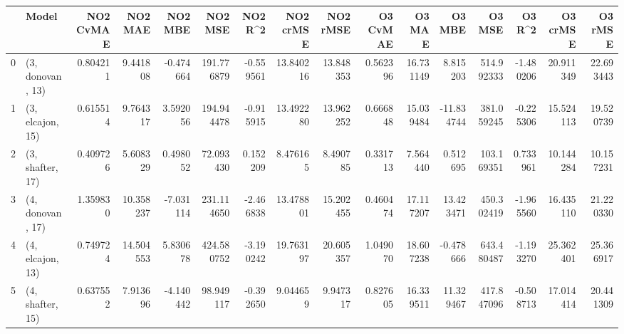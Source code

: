 \begin{tabular}{llrrrrrrrrrrrrrr}
\toprule
{} &             Model &  NO2 CvMAE &    NO2 MAE &   NO2 MBE &     NO2 MSE &   NO2 R\textasciicircum2 &  NO2 crMSE &   NO2 rMSE &  O3 CvMAE &     O3 MAE &     O3 MBE &      O3 MSE &    O3 R\textasciicircum2 &   O3 crMSE &    O3 rMSE \\
\midrule
0 &  (3, donovan, 13) &   0.804211 &   9.441808 & -0.474664 &  191.776879 & -0.559561 &  13.840216 &  13.848353 &  0.562396 &  16.731149 &   8.815203 &  514.992333 & -1.480206 &  20.911349 &  22.693443 \\
1 &  (3, elcajon, 15) &   0.615514 &   9.764317 &  3.592056 &  194.944478 & -0.915915 &  13.492280 &  13.962252 &  0.666848 &  15.039484 & -11.834744 &  381.059245 & -0.225306 &  15.524113 &  19.520739 \\
2 &  (3, shafter, 17) &   0.409726 &   5.608329 &  0.498052 &   72.093430 &  0.152209 &   8.476165 &   8.490785 &  0.331713 &   7.564440 &   0.512695 &  103.169351 &  0.733961 &  10.144284 &  10.157231 \\
3 &  (4, donovan, 17) &   1.359830 &  10.358237 & -7.031114 &  231.114650 & -2.466838 &  13.478801 &  15.202455 &  0.460474 &  17.117207 &  13.423471 &  450.302419 & -1.965560 &  16.435110 &  21.220330 \\
4 &  (4, elcajon, 13) &   0.749724 &  14.504553 &  5.830678 &  424.580752 & -3.190242 &  19.763197 &  20.605357 &  1.049070 &  18.607238 &  -0.478666 &  643.480487 & -1.193270 &  25.362401 &  25.366917 \\
5 &  (4, shafter, 15) &   0.637552 &   7.913696 & -4.140442 &   98.949117 & -0.392650 &   9.044659 &   9.947317 &  0.827605 &  16.339511 &  11.329467 &  417.847096 & -0.508713 &  17.014414 &  20.441309 \\
\bottomrule
\end{tabular}
